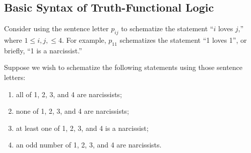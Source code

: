 \subsection{Basic Syntax of Truth-Functional Logic}
Consider using the sentence letter $p_{ij}$ to schematize the statement ``$i$ loves $j$,'' where $1\leq i,j,\leq 4$. For example, $p_{11}$ schematizes the statement ``1 loves 1'', or briefly, ``1 is a narcissist.'' 

Suppose we wish to schematize the following statements using those sentence letters: 

\begin{enumerate}
\item all of 1, 2, 3, and 4 are narcissists;\label{allnar}
\item none of 1, 2, 3, and 4 are narcissists;\label{nonar}
\item at least one of 1, 2, 3, and 4 is a narcissist;\label{onenar}
\item an odd number of 1, 2, 3, and 4 are narcissists.\label{oddnar}
\end{enumerate} 

